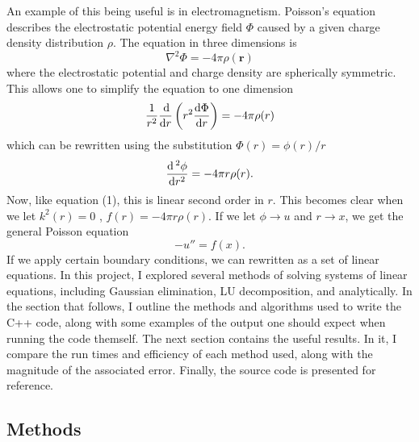 \documentclass[11pt]{article}
\begin{document}
    An example of this being useful is in electromagnetism. Poisson's equation describes the electrostatic potential energy field $\Phi$ caused by a given charge density distribution $\rho$. The equation in three dimensions is
    \begin{equation} \nabla^2 \Phi = - 4 \pi \rho(\mathbf{r}) \end{equation}
    where the electrostatic potential and charge density are spherically symmetric. This allows one to simplify the equation to one dimension 
    \begin{equation} \dfrac{1}{r^2} \dfrac{\dif}{\dif r} \left( r^2 \dfrac{\dif \Phi}{\dif r} \right) = -4\pi \rho(r) \end{equation}
    which can be rewritten using the substitution $\Phi (r) = \phi (r) /r$
    \begin{equation} \dfrac{\dif\,^2 \phi}{\dif{r^2}} = -4\pi r \rho(r). \end{equation}
    Now, like equation (1), this is linear second order in $r$. This becomes clear when we let $k^2(r)=0$ , $f(r)=-4\pi r \rho(r)$. If we let $\phi \to u$ and $r \to x$, we get the general Poisson equation
    \begin{equation} -u'' = f(x). \end{equation}
    If we apply certain boundary conditions, we can rewritten as a set of linear equations. In this project, I explored several methods of solving systems of linear equations, including Gaussian elimination, LU decomposition, and analytically. In the section that follows, I outline the methods and algorithms used to write the C++ code, along with some examples of the output one should expect when running the code themself. The next section contains the useful results. In it, I compare the run times and efficiency of each method used, along with the magnitude of the associated error. Finally, the source code is presented for reference.

\subsection{Methods}
\end{document}
